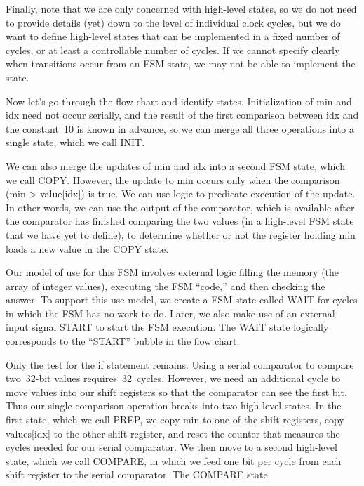 Finally, note that we are only concerned with high-level states, so we do 
not need to provide details (yet) down to the level of individual clock 
cycles, but we do want to define high-level states that can be implemented
in a fixed number of cycles, or at least a controllable number of cycles.
If we cannot specify clearly when transitions occur from an FSM state, we
may not be able to implement the state.

\pagebreak

Now let's go through the flow chart and identify states.  Initialization of
{\tfix min} and {\tfix idx} need not occur serially, and the result of the
first comparison between {\tfix idx} and the constant~10 is known in advance,
so we can merge all three operations into a single state, which we 
call {\tfix INIT}.

We can also merge the updates of {\tfix min} and {\tfix idx} into a second
FSM state, which we call {\tfix COPY}.  However, the update to {\tfix min} 
occurs only when the comparison ({\tfix min > value[idx]}) is true.  
We can use logic to predicate execution of the update.  In other words, we 
can use the output of the comparator, which is available after the comparator 
has finished comparing the two values (in a high-level FSM state that we 
have yet to define), to determine whether or not the register holding 
{\tfix min} loads a new value in the {\tfix COPY} state.

Our model of use for this FSM involves external logic filling the memory
(the array of integer values), executing the FSM ``code,'' and then
checking the answer.  To support this use model, we create a FSM state 
called {\tfix WAIT} for cycles in which the FSM has no work to do.
Later, we also make use of an external input signal {\tfix START} 
to start the FSM
execution.  The {\tfix WAIT} state logically corresponds to the ``START'' 
bubble in the flow chart.

\begin{minipage}{2.29in}
Only the test for the {\tfix if} statement remains.  Using a serial
comparator to compare two~\mbox{32-bit} values requires~32~cycles.
However, we need an additional cycle to move values into our shift 
registers so that the comparator can see the first bit.  Thus our
single comparison operation breaks into two high-level states.  In the
first state, which we call {\tfix PREP}, we copy {\tfix min} to one
of the shift registers, copy {\tfix values[idx]} to the other shift
register, and reset the counter that measures the cycles needed for
our serial comparator.  We then move to a second high-level state,
which we call {\tfix COMPARE}, in which we feed one bit per cycle
from each shift register to the serial comparator.  The {\tfix COMPARE} 
state\linebreak\mpdone
\end{minipage}\hspace{.25in}%
\begin{minipage}{3.96in}
\centerline{}
\end{minipage}

